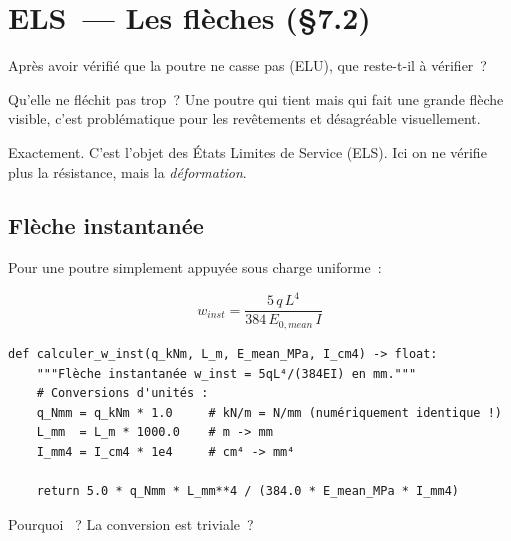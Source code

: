 \section{ELS~--- Les fl\`eches (\S{}7.2)}

\begin{maitre}
Apr\`es avoir v\'erifi\'e que la poutre ne casse pas (ELU),
que reste-t-il \`a v\'erifier~?
\end{maitre}

\begin{apprenti}
Qu'elle ne fl\'echit pas trop~? Une poutre qui tient mais qui fait
une grande fl\`eche visible, c'est probl\'ematique pour les rev\^etements
et d\'esagr\'eable visuellement.
\end{apprenti}

\begin{maitre}
Exactement. C'est l'objet des \'Etats Limites de Service (ELS).
Ici on ne v\'erifie plus la r\'esistance, mais la \emph{d\'eformation}.
\end{maitre}

\subsection{Fl\`eche instantan\'ee}

Pour une poutre simplement appuy\'ee sous charge uniforme~:

\begin{equation}
w_{inst} = \frac{5 \, q \, L^4}{384 \, E_{0,mean} \, I}
\label{eq:winst}
\end{equation}

\begin{lstlisting}[style=python, caption={\fichier{ec5/els.py} --- flèche instantanée}]
def calculer_w_inst(q_kNm, L_m, E_mean_MPa, I_cm4) -> float:
    """Flèche instantanée w_inst = 5qL⁴/(384EI) en mm."""
    # Conversions d'unités :
    q_Nmm = q_kNm * 1.0     # kN/m = N/mm (numériquement identique !)
    L_mm  = L_m * 1000.0    # m -> mm
    I_mm4 = I_cm4 * 1e4     # cm⁴ -> mm⁴

    return 5.0 * q_Nmm * L_mm**4 / (384.0 * E_mean_MPa * I_mm4)
\end{lstlisting}

\begin{maitre}
Pourquoi ~? La conversion est triviale~?
\end{maitre}


